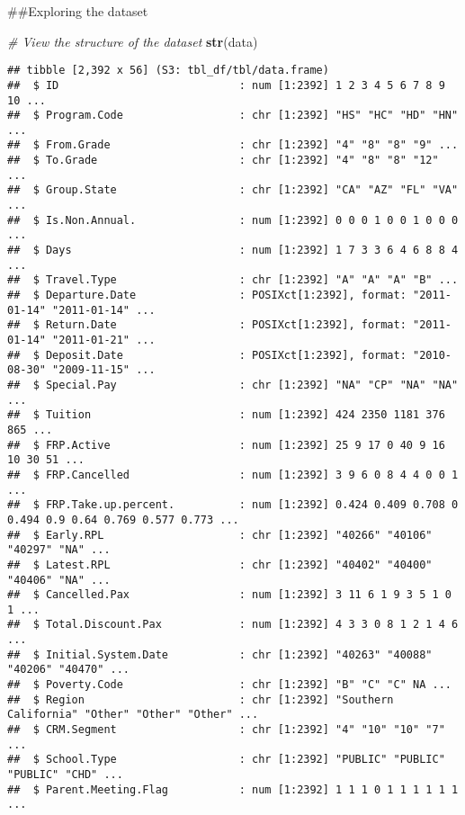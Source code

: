 \documentclass[
]{article}
\newenvironment{Shaded}{\begin{snugshade}}{\end{snugshade}}
\newcommand{\CommentTok}[1]{\textcolor[rgb]{0.56,0.35,0.01}{\textit{#1}}}
\newcommand{\FunctionTok}[1]{\textcolor[rgb]{0.13,0.29,0.53}{\textbf{#1}}}
\newcommand{\NormalTok}[1]{#1}
\begin{document}
\#\#Exploring the dataset

\begin{Shaded}
\begin{Highlighting}[]
\CommentTok{\# View the structure of the dataset}
\FunctionTok{str}\NormalTok{(data)}
\end{Highlighting}
\end{Shaded}

\begin{verbatim}
## tibble [2,392 x 56] (S3: tbl_df/tbl/data.frame)
##  $ ID                            : num [1:2392] 1 2 3 4 5 6 7 8 9 10 ...
##  $ Program.Code                  : chr [1:2392] "HS" "HC" "HD" "HN" ...
##  $ From.Grade                    : chr [1:2392] "4" "8" "8" "9" ...
##  $ To.Grade                      : chr [1:2392] "4" "8" "8" "12" ...
##  $ Group.State                   : chr [1:2392] "CA" "AZ" "FL" "VA" ...
##  $ Is.Non.Annual.                : num [1:2392] 0 0 0 1 0 0 1 0 0 0 ...
##  $ Days                          : num [1:2392] 1 7 3 3 6 4 6 8 8 4 ...
##  $ Travel.Type                   : chr [1:2392] "A" "A" "A" "B" ...
##  $ Departure.Date                : POSIXct[1:2392], format: "2011-01-14" "2011-01-14" ...
##  $ Return.Date                   : POSIXct[1:2392], format: "2011-01-14" "2011-01-21" ...
##  $ Deposit.Date                  : POSIXct[1:2392], format: "2010-08-30" "2009-11-15" ...
##  $ Special.Pay                   : chr [1:2392] "NA" "CP" "NA" "NA" ...
##  $ Tuition                       : num [1:2392] 424 2350 1181 376 865 ...
##  $ FRP.Active                    : num [1:2392] 25 9 17 0 40 9 16 10 30 51 ...
##  $ FRP.Cancelled                 : num [1:2392] 3 9 6 0 8 4 4 0 0 1 ...
##  $ FRP.Take.up.percent.          : num [1:2392] 0.424 0.409 0.708 0 0.494 0.9 0.64 0.769 0.577 0.773 ...
##  $ Early.RPL                     : chr [1:2392] "40266" "40106" "40297" "NA" ...
##  $ Latest.RPL                    : chr [1:2392] "40402" "40400" "40406" "NA" ...
##  $ Cancelled.Pax                 : num [1:2392] 3 11 6 1 9 3 5 1 0 1 ...
##  $ Total.Discount.Pax            : num [1:2392] 4 3 3 0 8 1 2 1 4 6 ...
##  $ Initial.System.Date           : chr [1:2392] "40263" "40088" "40206" "40470" ...
##  $ Poverty.Code                  : chr [1:2392] "B" "C" "C" NA ...
##  $ Region                        : chr [1:2392] "Southern California" "Other" "Other" "Other" ...
##  $ CRM.Segment                   : chr [1:2392] "4" "10" "10" "7" ...
##  $ School.Type                   : chr [1:2392] "PUBLIC" "PUBLIC" "PUBLIC" "CHD" ...
##  $ Parent.Meeting.Flag           : num [1:2392] 1 1 1 0 1 1 1 1 1 1 ...

\end{verbatim}
\end{document}
